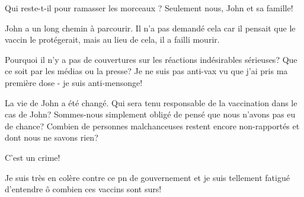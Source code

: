 Qui reste-t-il pour ramasser les morceaux ? Seulement nous, John et sa famille!

John a un long chemin à parcourir. Il n'a pas demandé cela car il pensait que le
vaccin le protégerait, mais au lieu de cela, il a failli mourir.

Pourquoi il n'y a pas de couvertures sur les réactions indésirables sérieuses?
Que ce soit par les médias ou la presse? Je ne suis pas anti-vax vu que j'ai
pris ma première dose - je suis anti-mensonge!

La vie de John a été changé. Qui sera tenu responsable de la vaccination dans le
cas de John? Sommes-nous simplement obligé de pensé que nous n'avons pas eu de
chance? Combien de personnes malchanceuses restent encore non-rapportés et dont
nous ne savons rien?

C'est un crime!

Je suis très en colère contre ce pn de gouvernement et je suis tellement fatigué
d'entendre ô combien ces vaccins sont surs!

